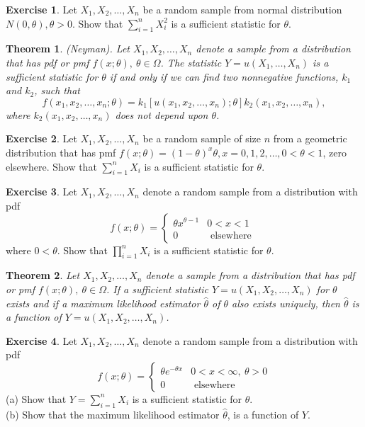\documentclass{article}
\newtheorem*{theorem*}{Theorem}
\theoremstyle{definition}
\newtheorem*{exercise*}{Exercise}
\begin{document}
	\begin{exercise*}
		Let $X_1, X_2, \ldots, X_n$ be a random sample from normal distribution $N(0, \theta), \theta > 0$. Show that $\sum_{i=1}^n X_i^2$ is a sufficient statistic for $\theta$.
	\end{exercise*}
	\begin{theorem*}
		(Neyman). Let $X_1, X_2, \ldots, X_n$ denote a sample from a distribution that has pdf or pmf $f(x ; \theta), \ \theta \in \Omega$. The statistic $Y=u\left(X_1, \ldots, X_n\right)$ is a sufficient statistic for $\theta$ if and only if we can find two nonnegative functions, $k_1$ and $k_2$, such that
		$$
		f\left(x_1, x_2, \ldots, x_n ; \theta\right)=k_1\left[u\left(x_1, x_2, \ldots, x_n\right) ; \theta\right] k_2\left(x_1, x_2, \ldots, x_n\right),
		$$
		where $k_2\left(x_1, x_2, \ldots, x_n\right)$ does not depend upon $\theta$.
	\end{theorem*}
	\begin{exercise*}
		Let $X_1, X_2, \ldots, X_n$ be a random sample of size $n$ from a geometric distribution that has pmf $f(x ; \theta)=(1-\theta)^x \theta, x=0,1,2, \ldots, 0<\theta<1$, zero elsewhere. Show that $\sum_{i=1}^n X_i$ is a sufficient statistic for $\theta$.
	\end{exercise*}
	\begin{exercise*}
		Let $X_1, X_2, \ldots, X_n$ denote a random sample from a distribution with pdf
		$$
		f(x ; \theta)= \begin{cases}\theta x^{\theta-1} & 0<x<1 \\ 0 & \text { elsewhere }\end{cases}
		$$
		where $0<\theta$. Show that $\prod_{i=1}^n X_i$ is a sufficient statistic for $\theta$.
	\end{exercise*}
	\begin{theorem*}
		Let $X_1, X_2, \ldots, X_n$ denote a sample from a distribution that has pdf or pmf $f(x ; \theta), \ \theta \in \Omega$. If a sufficient statistic $Y=u\left(X_1, X_2, \ldots, X_n\right)$ for $\theta$ exists and if a maximum likelihood estimator $\hat{\theta}$ of $\theta$ also exists uniquely, then $\hat{\theta}$ is a function of $Y=u\left(X_1, X_2, \ldots, X_n\right)$.
	\end{theorem*}
		\begin{exercise*}
		Let $X_1, X_2, \ldots, X_n$ denote a random sample from a distribution with pdf
		$$
		f(x ; \theta)= \begin{cases}\theta e^{-\theta x} & 0<x<\infty, \ \theta > 0 \\ 0 & \text { elsewhere }\end{cases}
		$$
		(a) Show that $Y = \sum_{i=1}^n X_i$ is a sufficient statistic for $\theta$.\\
		(b) Show that the maximum likelihood estimator $\hat{\theta}$, is a function of $Y$.
	\end{exercise*}
	

\end{document}

